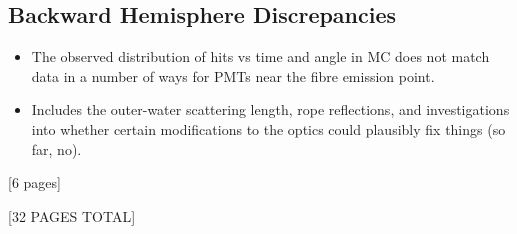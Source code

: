 {    \subsection{Backward Hemisphere Discrepancies}
    \begin{itemize}
        \item The observed distribution of hits vs time and angle in MC does not match data in a number of ways for PMTs near the fibre emission point.
        \item Includes the outer-water scattering length, rope reflections, and investigations into whether certain modifications to the optics could plausibly fix things (so far, no).
    \end{itemize}
   [6 pages]

   [32 PAGES TOTAL]
}